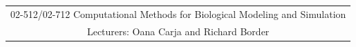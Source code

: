 \begin{center}
\begin{tabular*}{5.4in}{|c|}
\hline
02-512/02-712 Computational Methods for Biological Modeling and 
Simulation\\
Lecturers: Oana Carja and Richard Border \\
\hline
\end{tabular*}
\end{center}

